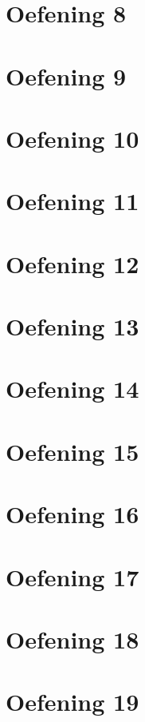 \documentclass[a4paper,11pt]{report}
\begin{document}
\section{Oefening 8}

\section{Oefening 9}

\section{Oefening 10}

\section{Oefening 11}

\section{Oefening 12}

\section{Oefening 13}

\section{Oefening 14}

\section{Oefening 15}

\section{Oefening 16}

\section{Oefening 17}

\section{Oefening 18}

\section{Oefening 19}

\end{document}
